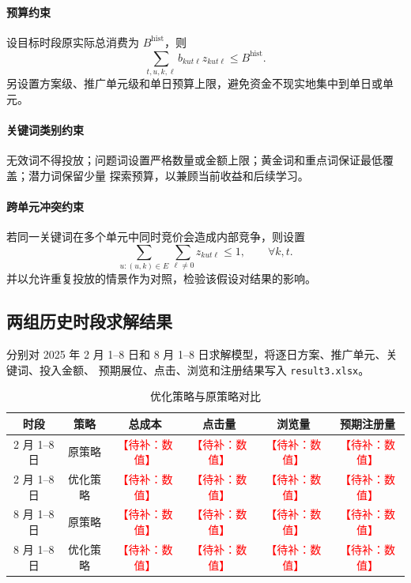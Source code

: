 \documentclass[UTF8,a4paper,zihao=-4]{ctexart}
\newcommand{\placeholder}[1]{\textcolor{red}{【待补：#1】}}
\begin{document}
\paragraph{预算约束}
设目标时段原实际总消费为 $B^{\mathrm{hist}}$，则
\begin{equation}
  \sum_{t,u,k,\ell}b_{kut\ell}z_{kut\ell}\leq B^{\mathrm{hist}}.
\end{equation}
另设置方案级、推广单元级和单日预算上限，避免资金不现实地集中到单日或单元。

\paragraph{关键词类别约束}
无效词不得投放；问题词设置严格数量或金额上限；黄金词和重点词保证最低覆盖；潜力词保留少量
探索预算，以兼顾当前收益和后续学习。

\paragraph{跨单元冲突约束}
若同一关键词在多个单元中同时竞价会造成内部竞争，则设置
\begin{equation}
  \sum_{u:(u,k)\in E}\sum_{\ell\neq 0}z_{kut\ell}\leq 1,
  \qquad \forall k,t.
\end{equation}
并以允许重复投放的情景作为对照，检验该假设对结果的影响。

\subsection{两组历史时段求解结果}

分别对 2025 年 2 月 1--8 日和 8 月 1--8 日求解模型，将逐日方案、推广单元、关键词、投入金额、
预期展位、点击、浏览和注册结果写入 \texttt{result3.xlsx}。

\begin{table}[H]
  \centering
  \caption{优化策略与原策略对比}
  \label{tab:q3-compare}
  \begin{tabular}{cccccc}
    \toprule
    时段 & 策略 & 总成本 & 点击量 & 浏览量 & 预期注册量 \\
    \midrule
    2 月 1--8 日 & 原策略 & \placeholder{数值} & \placeholder{数值} & \placeholder{数值} & \placeholder{数值} \\
    2 月 1--8 日 & 优化策略 & \placeholder{数值} & \placeholder{数值} & \placeholder{数值} & \placeholder{数值} \\
    8 月 1--8 日 & 原策略 & \placeholder{数值} & \placeholder{数值} & \placeholder{数值} & \placeholder{数值} \\
    8 月 1--8 日 & 优化策略 & \placeholder{数值} & \placeholder{数值} & \placeholder{数值} & \placeholder{数值} \\
    \bottomrule
  \end{tabular}
\end{table}
\end{document}
